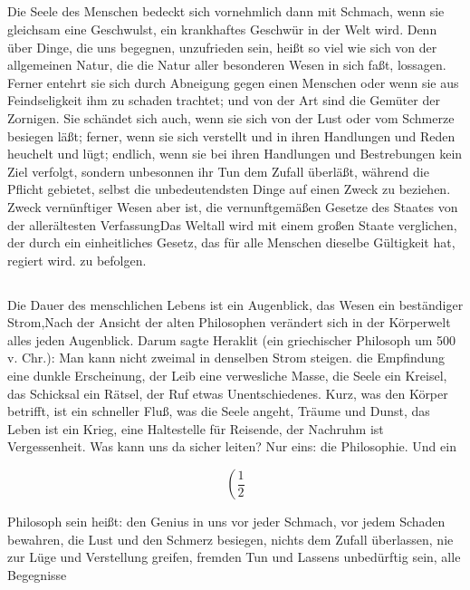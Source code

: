 \documentclass[12pt,ngerman,parskip=full]{scrartcl}
\newcounter{abschnitt}
\newcommand{\abschnitt}{\subsection*{\theabschnitt}\stepcounter{abschnitt}}
\begin{document}
\abschnitt

Die Seele des Menschen bedeckt sich vornehmlich dann mit Schmach, wenn sie gleichsam eine Geschwulst, ein krankhaftes Geschwür in der Welt wird. Denn über Dinge, die uns begegnen, unzufrieden sein, heißt so viel wie sich von der allgemeinen Natur, die die Natur aller besonderen Wesen in sich faßt, lossagen. Ferner entehrt sie sich durch Abneigung gegen einen Menschen oder wenn sie aus Feindseligkeit ihm zu schaden trachtet; und von der Art sind die Gemüter der Zornigen. Sie schändet sich auch, wenn sie sich von der Lust oder vom Schmerze besiegen läßt; ferner, wenn sie sich verstellt und in ihren Handlungen und Reden heuchelt und lügt; endlich, wenn sie bei ihren Handlungen und Bestrebungen kein Ziel verfolgt, sondern unbesonnen ihr Tun dem Zufall überläßt, während die Pflicht gebietet, selbst die unbedeutendsten Dinge auf einen Zweck zu beziehen. Zweck vernünftiger Wesen aber ist, die vernunftgemäßen Gesetze des Staates von der allerältesten VerfassungDas Weltall wird mit einem großen Staate verglichen, der durch ein einheitliches Gesetz, das für alle Menschen dieselbe Gültigkeit hat, regiert wird. zu befolgen.

\abschnitt

Die Dauer des menschlichen Lebens ist ein Augenblick, das Wesen ein beständiger Strom,Nach der Ansicht der alten Philosophen verändert sich in der Körperwelt alles jeden Augenblick. Darum sagte Heraklit (ein griechischer Philosoph um 500 v. Chr.): Man kann nicht zweimal in denselben Strom steigen. die Empfindung eine dunkle Erscheinung, der Leib eine verwesliche Masse, die Seele ein Kreisel, das Schicksal ein Rätsel, der Ruf etwas Unentschiedenes. Kurz, was den Körper betrifft, ist ein schneller Fluß, was die Seele angeht, Träume und Dunst, das Leben ist ein Krieg, eine Haltestelle für Reisende, der Nachruhm ist Vergessenheit. Was kann uns da sicher leiten? Nur eins: die Philosophie. Und ein

\begin{equation}
\left(\frac{1}{2}\right. 
\end{equation}


 Philosoph sein heißt: den Genius in uns vor jeder Schmach, vor jedem Schaden bewahren, die Lust und den Schmerz besiegen, nichts dem Zufall überlassen, nie zur Lüge und Verstellung greifen, fremden Tun und Lassens unbedürftig sein, alle Begegnisse 
 
 
\end{document}
